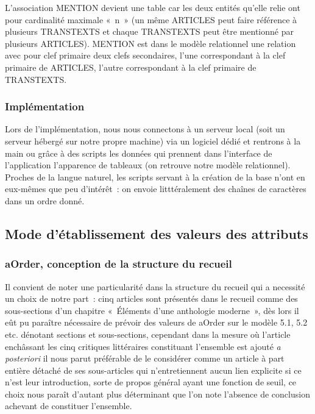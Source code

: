\documentclass[12pt, a4paper]{article}
\begin{document}
L'association MENTION devient une table car les deux entités qu'elle relie ont pour cardinalité maximale «~n~» (un même ARTICLES peut faire référence à plusieurs TRANSTEXTS et chaque TRANSTEXTS peut être mentionné par plusieurs ARTICLES). MENTION est dans le modèle relationnel une relation avec pour clef primaire deux clefs secondaires, l'une correspondant à la clef primaire de ARTICLES, l'autre correspondant à la clef primaire de TRANSTEXTS.


\subsubsection{Implémentation}
    Lors de l'implémentation, nous nous connectons à un serveur local (soit un serveur hébergé sur notre propre machine) via un logiciel dédié et rentrons à la main ou grâce à des scripts les données qui prennent dans l'interface de l'application l'apparence de tableaux (on retrouve notre modèle relationnel). Proches de la langue naturel, les scripts servant à la création de la base n'ont en eux-mêmes que peu d'intérêt~: on envoie litttéralement des chaînes de caractères dans un ordre donné.

\subsection{Mode d'établissement des valeurs des attributs} 
\label{ref:dbEtabValeurs}
\subsubsection{aOrder, conception de la structure du recueil}
Il convient de noter une particularité dans la structure du recueil qui a necessité un choix de notre part~: cinq articles sont présentés dans le recueil comme des sous-sections d'un chapitre «~Éléments d'une anthologie moderne~», dès lors il eût pu paraître nécessaire de prévoir des valeurs de aOrder sur le modèle 5.1, 5.2 etc. dénotant sections et sous-sections, cependant dans la mesure où l'article enchâssant les cinq critiques littéraires constituant l'ensemble est ajouté \textit{a posteriori} il nous parut préférable de le considérer comme un article à part entière détaché de ses sous-articles qui n'entretiennent aucun lien explicite si ce n'est leur introduction, sorte de propos général ayant une fonction de seuil, ce choix nous paraît d'autant plus déterminant que l'on note l'absence de conclusion achevant de constituer l'ensemble.
\end{document}
